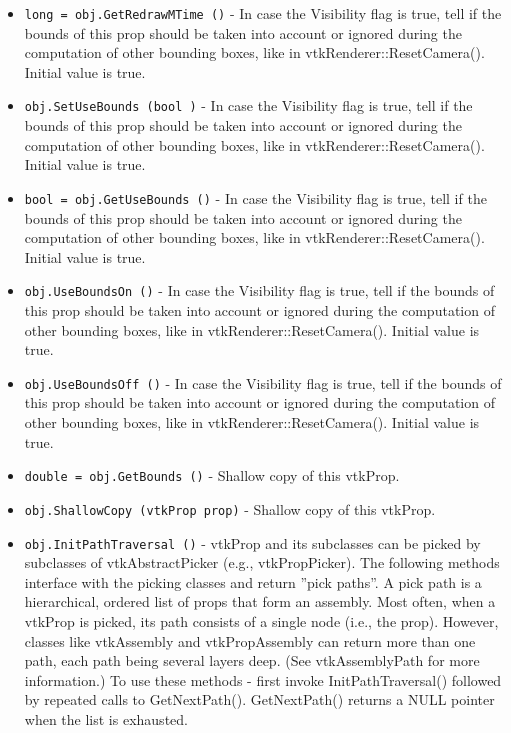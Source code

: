 \begin{itemize}
\item  \verb|long = obj.GetRedrawMTime ()| -  In case the Visibility flag is true, tell if the bounds of this prop
 should be taken into account or ignored during the computation of other
 bounding boxes, like in vtkRenderer::ResetCamera().
 Initial value is true.

\item  \verb|obj.SetUseBounds (bool )| -  In case the Visibility flag is true, tell if the bounds of this prop
 should be taken into account or ignored during the computation of other
 bounding boxes, like in vtkRenderer::ResetCamera().
 Initial value is true.

\item  \verb|bool = obj.GetUseBounds ()| -  In case the Visibility flag is true, tell if the bounds of this prop
 should be taken into account or ignored during the computation of other
 bounding boxes, like in vtkRenderer::ResetCamera().
 Initial value is true.

\item  \verb|obj.UseBoundsOn ()| -  In case the Visibility flag is true, tell if the bounds of this prop
 should be taken into account or ignored during the computation of other
 bounding boxes, like in vtkRenderer::ResetCamera().
 Initial value is true.

\item  \verb|obj.UseBoundsOff ()| -  In case the Visibility flag is true, tell if the bounds of this prop
 should be taken into account or ignored during the computation of other
 bounding boxes, like in vtkRenderer::ResetCamera().
 Initial value is true.

\item  \verb|double = obj.GetBounds ()| -  Shallow copy of this vtkProp.

\item  \verb|obj.ShallowCopy (vtkProp prop)| -  Shallow copy of this vtkProp.

\item  \verb|obj.InitPathTraversal ()| -  vtkProp and its subclasses can be picked by subclasses of
 vtkAbstractPicker (e.g., vtkPropPicker). The following methods interface
 with the picking classes and return ''pick paths''. A pick path is a
 hierarchical, ordered list of props that form an assembly.  Most often,
 when a vtkProp is picked, its path consists of a single node (i.e., the
 prop). However, classes like vtkAssembly and vtkPropAssembly can return
 more than one path, each path being several layers deep. (See
 vtkAssemblyPath for more information.)  To use these methods - first
 invoke InitPathTraversal() followed by repeated calls to GetNextPath().
 GetNextPath() returns a NULL pointer when the list is exhausted.


\end{itemize}
